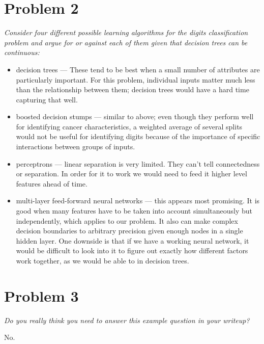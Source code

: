 \documentclass{article}
\begin{document}
  \section*{Problem 2}
  \textit{Consider four different possible learning algorithms for the
    digits classification problem and argue for or against each of
    them given that decision trees can be continuous:}
  \begin{itemize}
  \item decision trees --- These tend to be best when a small number
    of attributes are particularly important. For this problem,
    individual inputs matter much less than the relationship between
    them; decision trees would have a hard time capturing that well.
  \item boosted decision stumps --- similar to above; even though they
    perform well for identifying cancer characteristics, a weighted
    average of several splits would not be useful for identifying
    digits because of the importance of specific interactions between
    groups of inputs.
  \item perceptrons --- linear separation is very limited. They can't
    tell connectedness or separation. In order for it to work we would
    need to feed it higher level features ahead of time.
  \item multi-layer feed-forward neural networks --- this appears most
    promising.  It is good when many features have to be taken into
    account simultaneously but independently, which applies to our
    problem. It also can make complex decision boundaries to arbitrary
    precision given enough nodes in a single hidden layer. One
    downside is that if we have a working neural network, it would be
    difficult to look into it to figure out exactly how different
    factors work together, as we would be able to in decision trees.
  \end{itemize}

  \section*{Problem 3}
  \textit{Do you really think you need to answer this example
    question in your writeup?}

  No.
\end{document}
